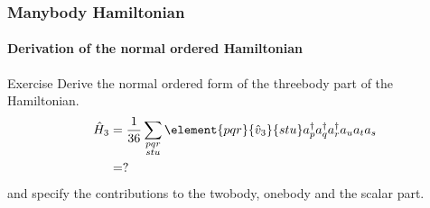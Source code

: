 \begin{frame}[fragile]
    \frametitle{Manybody Hamiltonian}
    \framesubtitle{Derivation of the normal ordered Hamiltonian}

    \begin{block}{\centering Exercise}
     Derive the normal ordered form of the threebody part of the Hamiltonian.
    \begin{align*}
    \hat{H}_3 &= \frac{1}{36} \sum_{\substack{
                        pqr \\
                        stu}}
                 \element{pqr}{\hat{v}_3}{stu} a^\dagger_p a^\dagger_q a^\dagger_r a_u a_t a_s \\
        &= ?
    \end{align*}
    and specify the contributions to the twobody, onebody and the scalar part.
    \end{block}



\end{frame}
